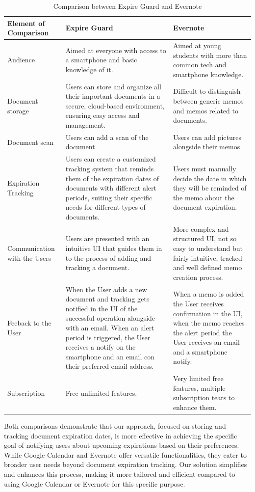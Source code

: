 \begin{table}[H]
	
	\begin{tabularx}{\textwidth}{|X|X|X|}
		\hline
		\textbf{Element of Comparison} & \textbf{Expire Guard} & \textbf{Evernote} \\
		\hline
		Audience  & Aimed at everyone with access to a smartphone and basic knowledge of it. & Aimed at young students with more than common tech and smartphone knowledge.
		
		\\
		\hline
		Document storage & Users can store and organize all their important documents in a secure, cloud-based environment, ensuring easy access and management. & Difficult to distinguish between generic memos and memos related to documents. \\
		\hline
		Document scan & Users can add a scan of the document & Users can add pictures alongside their memos \\
		\hline
		Expiration Tracking & Users can create a customized tracking system that reminds them of the expiration dates of documents with different alert periods, suiting their specific needs for different types of documents. & Users must manually decide the date in which they will be reminded of the memo about the document expiration. \\
		\hline
		Communication with the Users& Users are presented with an intuitive UI that guides them in to the process of adding and tracking a document. & More complex and structured UI, not so easy to understand but fairly intuitive, tracked and well defined memo creation process. \\
		\hline
		Feeback to the User& When the User adds a new document and tracking gets notified in the UI of the successful operation alongside with an email. When an alert period is triggered, the User receives a notify on the smartphone and an email con their preferred email address. & When a memo is added the User receives confirmation in the UI, when the memo reaches the alert period the User receives an email and a smartphone notify. \\
		\hline
		Subscription  & Free unlimited features. & Very limited free features, multiple subscription tears to enhance them. \\
		\hline
	\end{tabularx}
	\caption{Comparison between Expire Guard and Evernote}
\end{table}
\noindent
Both comparisons demonstrate that our approach, focused on storing and tracking document expiration dates, is more effective in achieving the specific goal of notifying users about upcoming expirations based on their preferences. While Google Calendar and Evernote offer versatile functionalities, they cater to broader user needs beyond document expiration tracking. Our solution simplifies and enhances this process, making it more tailored and efficient compared to using Google Calendar or Evernote for this specific purpose.\\
